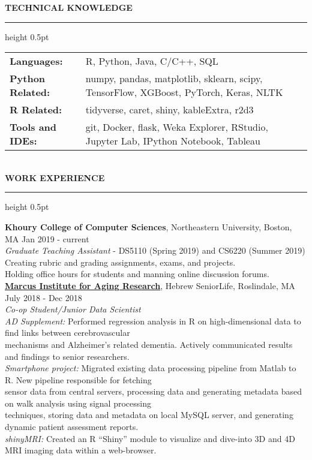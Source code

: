 \documentclass[a4paper]{article}
\newcommand{\myline}{\par
  \kern2pt %
  \hrule height 0.5pt
  \kern2pt %
}
\newcommand{\mybullet}{
	\indent \textbullet \hspace*{2mm}
}
\newcommand{\linetab}{
  \\ \hspace*{9mm}
}
\begin{document}
	\noindent
	{\large \textbf{TECHNICAL KNOWLEDGE}}
	\myline 
	
	\noindent
	\begin{tabular}{ m{3cm} l }
		\textbf{Languages: } & R, Python, Java, C/C++, SQL \\ 
    \textbf{Python Related: } & numpy, pandas, matplotlib, sklearn, scipy, TensorFlow, XGBoost, PyTorch, Keras, NLTK \\ 
    \textbf{R Related: } & tidyverse, caret, shiny, kableExtra, r2d3 \\
		\textbf{Tools and IDEs: } & git, Docker, flask, Weka Explorer, RStudio, 
                Jupyter Lab, IPython Notebook, Tableau \\
	\end{tabular} \\

	\smallskip
	\smallskip
	\noindent
	{\large \textbf{WORK EXPERIENCE}}
	\myline 
	\smallskip
	
  \noindent
  \textbf{Khoury College of Computer Sciences}, Northeastern University, Boston, MA
  \hfill Jan 2019 - current \\
  \textit{Graduate Teaching Assistant} - DS5110 (Spring 2019) and CS6220 (Summer 2019) \\
  \mybullet Creating rubric and grading assignments, exams, and projects. \\
  \mybullet Holding office hours for students and manning online discussion forums. \\

  \noindent
  \textbf{\href{https://www.marcusinstituteforaging.org/}{Marcus Institute for Aging Research}}, 
  Hebrew SeniorLife, Roslindale, MA 
  \hfill July 2018 - Dec 2018 \\
        \textit{Co-op Student/Junior Data Scientist} \\
        \mybullet \textit{AD Supplement:} Performed regression analysis in R on high-dimensional 
        data to find links between cerebrovascular  \\ \hspace*{9mm} mechanisms 
        and Alzheimer's related dementia. Actively communicated results and findings to senior
        researchers. \\
        \mybullet \textit{Smartphone project:} Migrated existing data processing pipeline from 
        Matlab to R. New pipeline responsible for fetching \linetab sensor data from 
        central servers, processing data and generating metadata based on walk analysis 
        using signal processing \linetab techniques, storing data and metadata on local 
        MySQL server, and generating dynamic patient assessment reports. \\
        \mybullet \textit{shinyMRI: } Created an R ``Shiny'' module to visualize and 
        dive-into 3D and 4D MRI imaging data within a web-browser. \\
        
\end{document}
